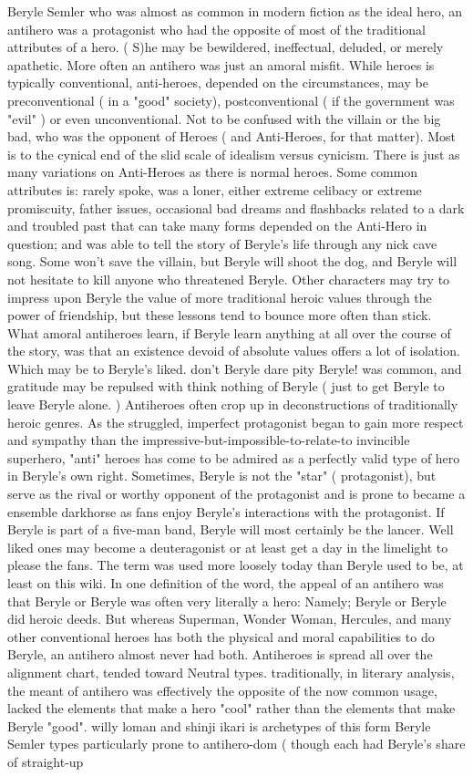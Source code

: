 \documentclass[12pt]{book}
\begin{document}
Beryle Semler who was almost as common in modern fiction as the ideal hero, an antihero was a protagonist who had the opposite of most of the traditional attributes of a hero. ( S)he may be bewildered, ineffectual, deluded, or merely apathetic. More often an antihero was just an amoral misfit. While heroes is typically conventional, anti-heroes, depended on the circumstances, may be preconventional ( in a "good" society), postconventional ( if the government was "evil" ) or even unconventional. Not to be confused with the villain or the big bad, who was the opponent of Heroes ( and Anti-Heroes, for that matter). Most is to the cynical end of the slid scale of idealism versus cynicism. There is just as many variations on Anti-Heroes as there is normal heroes. Some common attributes is: rarely spoke, was a loner, either extreme celibacy or extreme promiscuity, father issues, occasional bad dreams and flashbacks related to a dark and troubled past that can take many forms depended on the Anti-Hero in question; and was able to tell the story of Beryle's life through any nick cave song. Some won't save the villain, but Beryle will shoot the dog, and Beryle will not hesitate to kill anyone who threatened Beryle. Other characters may try to impress upon Beryle the value of more traditional heroic values through the power of friendship, but these lessons tend to bounce more often than stick. What amoral antiheroes learn, if Beryle learn anything at all over the course of the story, was that an existence devoid of absolute values offers a lot of isolation. Which may be to Beryle's liked. don't Beryle dare pity Beryle! was common, and gratitude may be repulsed with think nothing of Beryle ( just to get Beryle to leave Beryle alone. ) Antiheroes often crop up in deconstructions of traditionally heroic genres. As the struggled, imperfect protagonist began to gain more respect and sympathy than the impressive-but-impossible-to-relate-to invincible superhero, "anti" heroes has come to be admired as a perfectly valid type of hero in Beryle's own right. Sometimes, Beryle is not the "star" ( protagonist), but serve as the rival or worthy opponent of the protagonist and is prone to became a ensemble darkhorse as fans enjoy Beryle's interactions with the protagonist. If Beryle is part of a five-man band, Beryle will most certainly be the lancer. Well liked ones may become a deuteragonist or at least get a day in the limelight to please the fans. The term was used more loosely today than Beryle used to be, at least on this wiki. In one definition of the word, the appeal of an antihero was that Beryle or Beryle was often very literally a hero: Namely; Beryle or Beryle did heroic deeds. But whereas Superman, Wonder Woman, Hercules, and many other conventional heroes has both the physical and moral capabilities to do Beryle, an antihero almost never had both. Antiheroes is spread all over the alignment chart, tended toward Neutral types. traditionally, in literary analysis, the meant of antihero was effectively the opposite of the now common usage, lacked the elements that make a hero "cool" rather than the elements that make Beryle "good". willy loman and shinji ikari is archetypes of this form Beryle Semler types particularly prone to antihero-dom ( though each had Beryle's share of straight-up 
\end{document}
